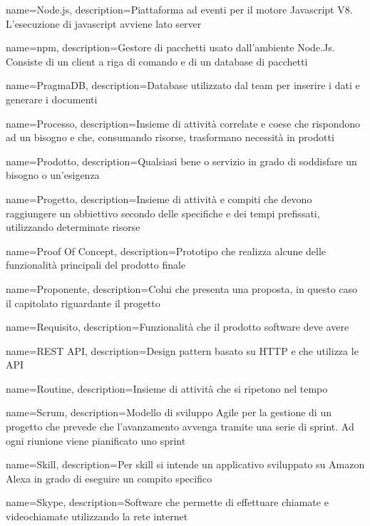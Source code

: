 {
name={Node.js},
description={Piattaforma ad eventi per il motore Javascript V8. L’esecuzione di javascript avviene lato server}
}

{
	name={npm},
	description={Gestore di pacchetti usato dall'ambiente Node.Js. Consiste di un client a riga di comando e di un database di pacchetti}
}

{
	name={PragmaDB},
	description={Database utilizzato dal team per inserire i dati e generare i documenti}
}

{
name={Processo},
description={Insieme di attività correlate e coese che rispondono ad un bisogno e che, consumando risorse, trasformano necessità in prodotti}
}

{
name={Prodotto},
description={Qualsiasi bene o servizio in grado di soddisfare un bisogno o un’esigenza}
}

{
name={Progetto},
description={Insieme di attività e compiti che devono raggiungere un obbiettivo secondo delle specifiche e dei tempi prefissati, utilizzando determinate risorse}
}

{
	name={Proof Of Concept},
	description={Prototipo che realizza alcune delle funzionalità principali del prodotto finale}
}

{
name={Proponente},
description={Colui che presenta una proposta, in questo caso il capitolato riguardante il progetto}
}

{
name={Requisito},
description={Funzionalità che il prodotto software deve avere}
}

{
	name={REST API},
	description={Design pattern basato su HTTP e che utilizza le API}
}


{
name={Routine},
description={Insieme di attività che si ripetono nel tempo}
}

{
name={Scrum},
description={Modello di sviluppo Agile per la gestione di un progetto che prevede che l’avanzamento avvenga tramite una serie di sprint. Ad ogni riunione viene pianificato uno sprint}
}

{
name={Skill},
description={Per skill si intende un applicativo sviluppato su Amazon Alexa in grado di eseguire un compito specifico}
}

{
name={Skype},
description={Software che permette di effettuare chiamate e videochiamate utilizzando la rete internet}
}

